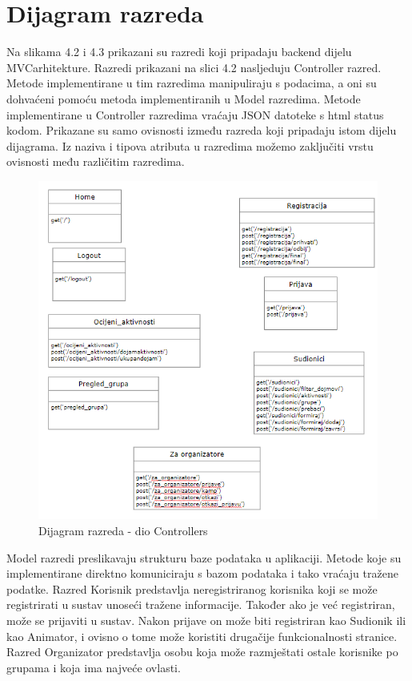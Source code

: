 			\eject
			
			\newpage
			
		\section{Dijagram razreda}
		
Na slikama 4.2 i 4.3 prikazani su razredi koji pripadaju backend dijelu MVCarhitekture.  Razredi prikazani na slici 4.2 nasljeduju Controller razred.  Metode implementirane u tim razredima manipuliraju s podacima, a oni su dohvaćeni pomoću metoda implementiranih u Model razredima.  Metode implementirane u Controller razredima vraćaju JSON datoteke s html status kodom. Prikazane su samo ovisnosti između razreda koji pripadaju istom dijelu dijagrama. Iz naziva i tipova atributa u razredima možemo zaključiti vrstu ovisnosti među različitim razredima. \\
\begin{figure}[htpb]
	\centering
	\includegraphics[scale=1]{dijagrami/controller_uml.PNG}
	\caption{Dijagram razreda - dio Controllers}
	\label{fig: dijagram razreda models}
\end{figure}
\newpage

Model razredi preslikavaju strukturu baze podataka u aplikaciji. Metode koje su implementirane direktno komuniciraju s bazom podataka i tako vraćaju tražene podatke. Razred Korisnik predstavlja neregistriranog korisnika koji se može registrirati u sustav unoseći tražene informacije. Također ako je već registriran, može se prijaviti u sustav. Nakon prijave on može biti registriran kao Sudionik ili kao Animator, i ovisno o tome može koristiti drugačije funkcionalnosti stranice. Razred Organizator predstavlja osobu koja može razmještati ostale korisnike po grupama i koja ima najveće ovlasti.\\

